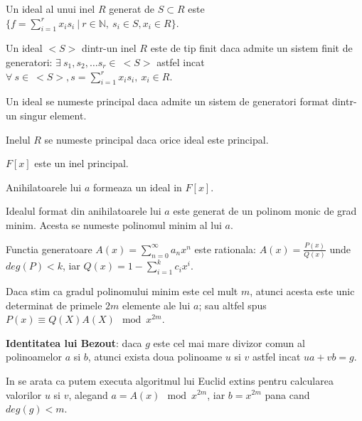 \begin{defn}
  Un ideal al unui inel $R$ generat de $S \subset R$ este
  $\{f = \sum_{i=1}^{r} x_{i}s_{i} \ | \ r \in \mathbb{N}, \ s_{i} \in S, x_{i} \in R\}$.
\end{defn}

\begin{defn}
  Un ideal $<S>$ dintr-un inel $R$ este de tip finit daca admite un sistem finit de generatori:
  $\exists \ s_{1}, s_{2}, \ldots s_{r} \in \ <S>$  astfel incat
  $\forall \ s \in \ <S>, s = \sum_{i=1}^{r} x_{i} s_{i}, \ x_{i} \in R$.
\end{defn}

\begin{defn}
  Un ideal se numeste principal daca admite un sistem de generatori format
  dintr-un singur element.
\end{defn}

\begin{defn}
  Inelul $R$ se numeste principal daca orice ideal este principal.
\end{defn}

\begin{thm}
  $F[x]$ este un inel principal.
\end{thm}

\begin{lem}
  Anihilatoarele lui $a$ formeaza un ideal in $F[x]$.
\end{lem}

\begin{clr}
  Idealul format din anihilatoarele lui $a$ este generat de un polinom monic de
  grad minim. Acesta se numeste polinomul minim al lui $a$.
\end{clr}

\begin{thm}
  Functia generatoare $A(x) = \sum_{n=0}^{\infty} a_{n}x^{n}$ este rationala:
  $A(x) = \frac{P(x)}{Q(x)}$ unde $deg(P) < k$, iar $Q(x) = 1 - \sum_{i=1}^{k} c_{i}x^{i}$.
\end{thm}

\begin{thm}
  Daca stim ca gradul polinomului minim este cel mult $m$, atunci acesta este
  unic determinat de primele $2m$ elemente ale lui $a$; sau altfel spus
  $P(x) \equiv Q(X) A(X) \mod x^{2m}$.
\end{thm}

\textbf{Identitatea lui Bezout}: daca $g$ este cel mai mare divizor comun al
polinoamelor $a$ si $b$, atunci exista doua polinoame $u$ si $v$ astfel incat
$ua + vb = g$.

In \cite{sugiyama} se arata ca putem executa algoritmul lui Euclid extins pentru
calcularea valorilor $u$ si $v$, alegand $a = A(x) \mod x^{2m}$, iar
$b = x^{2m}$ pana cand $deg(g) < m$.
